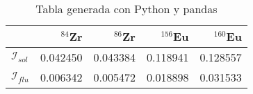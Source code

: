 \begin{table}
\caption{Tabla generada con Python y pandas}
\label{tab:datos}
\begin{tabular}{lrrrr}
\toprule
  & $^{84}$Zr & $^{86}$Zr & $^{156}$Eu & $^{160}$Eu \\
\midrule
$\mathcal{I}_{sol}$ & 0.042450 & 0.043384 & 0.118941 & 0.128557 \\
$\mathcal{I}_{flu}$ & 0.006342 & 0.005472 & 0.018898 & 0.031533 \\
\bottomrule
\end{tabular}
\end{table}
